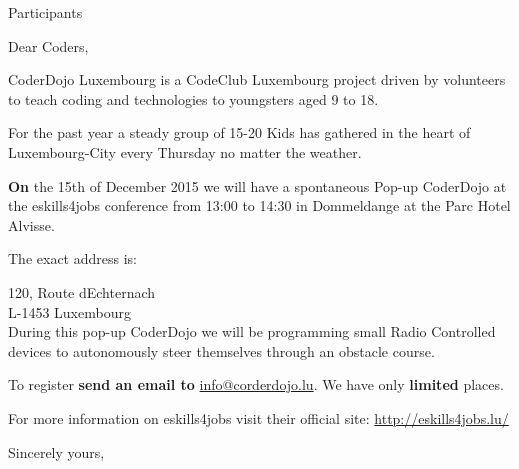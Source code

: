 \documentclass[DIN, pagenumber=false, parskip=half, fromalign=right, fromrule=false,fromlogo]{scrlttr2}
\begin{document}
 
\begin{letter}{ Participants}

\opening{Dear Coders,}

CoderDojo Luxembourg is a CodeClub Luxembourg project driven by volunteers to teach coding and technologies to youngsters aged 9 to 18.

For the past year a steady group of 15-20 Kids has gathered in the heart of Luxembourg-City every Thursday no matter the weather. 

\textbf{On} the 15th of December 2015 we will have a spontaneous Pop-up CoderDojo at the eskills4jobs conference from 13:00 to 14:30 in Dommeldange at the Parc Hotel Alvisse.

The exact address is:

120, Route d{\textquotesingle}Echternach \\
L-1453 Luxembourg \\

During this pop-up CoderDojo we will be programming small Radio Controlled devices to autonomously steer themselves through an obstacle course. 

To register \textbf{send an email to} \url{info@corderdojo.lu}. We have only \textbf{limited} places.

For more information on eskills4jobs visit their official site: \url{http://eskills4jobs.lu/}

\closing{Sincerely yours,}

\end{letter}
\end{document}
